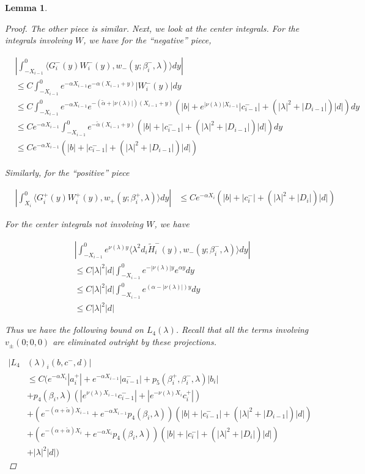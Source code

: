 \documentclass[12pt]{article}
\newtheorem{lemma}{Lemma}
\begin{document}
\begin{lemma}
\begin{proof}
The other piece is similar. Next, we look at the center integrals. For the integrals involving $W$, we have for the ``negative'' piece,

\begin{align*}
&\left| \int_{-X_{i-1}}^0 \langle G_i^-(y) W_i^-(y), w_-(y; \beta_i^-, \lambda) \rangle dy \right| \\
&\leq C \int_{-X_{i-1}}^0 e^{-\alpha X_{i-1}} e^{-\alpha(X_{i-1} + y)} |W_i^-(y)| dy \\
&\leq C \int_{-X_{i-1}}^0 e^{-\alpha X_{i-1}} e^{-(\tilde{\alpha} + |\nu(\lambda)|)(X_{i-1} + y)} ( |b| + e^{|\nu(\lambda)|X_{i-1}}|c_{i-1}^-| + (|\lambda|^2 + |D_{i-1}|)|d| ) dy \\
&\leq C e^{-\alpha X_{i-1}} \int_{-X_{i-1}}^0  e^{-\tilde{\alpha}(X_{i-1} + y)} ( |b| + |c_{i-1}^-| + (|\lambda|^2 + |D_{i-1}|)|d| ) dy \\
&\leq C e^{-\alpha X_{i-1}} ( |b| + |c_{i-1}^-| + (|\lambda|^2 + |D_{i-1}|)|d| )
\end{align*}

Similarly, for the ``positive'' piece

\begin{align*}
&\left| \int_{X_i}^0 \langle G_i^+(y) W_i^+(y), w_+(y; \beta_i^+, \lambda) \rangle dy \right| 
&\leq C e^{-\alpha X_i}  ( |b| + |c_i^-| + (|\lambda|^2 + |D_i|)|d| )
\end{align*}

For the center integrals not involving $W$, we have

\begin{align*}
&\left| \int_{-X_{i-1}}^0
e^{\nu(\lambda)y} \langle \lambda^2 d_i \tilde{H}_i^-(y), w_-(y; \beta_i^-, \lambda) \rangle dy \right| \\
&\leq C |\lambda|^2 |d| \int_{-X_{i-1}}^0 e^{-|\nu(\lambda)|y}e^{\alpha y} dy \\
&\leq C |\lambda|^2 |d| \int_{-X_{i-1}}^0 e^{(\alpha -|\nu(\lambda)|) y} dy \\
&\leq C |\lambda|^2 |d| 
\end{align*}

Thus we have the following bound on $L_4(\lambda)$. Recall that all the terms involving $v_\pm(0; 0, 0)$ are eliminated outright by these projections.

\begin{align*}
|L_4&(\lambda)_i(b, c^-, d)|\\ 
&\leq C \Big( e^{-\alpha X_i} |a_i^+| +  e^{-\alpha X_{i-1}} |a_{i-1}^-| + p_5(\beta_i^+, \beta_i^-, \lambda) |b_i| \\
&+ p_4(\beta_i, \lambda)( |e^{\nu(\lambda)X_{i-1}} c_{i-1}^-| + |e^{-\nu(\lambda)X_i} c_i^+|) \\
&+ (e^{-(\alpha + \tilde{\alpha}) X_{i-1}} + e^{-\alpha X_{i-1}} p_4(\beta_i, \lambda))( |b| + |c_{i-1}^-| + (|\lambda|^2 + |D_{i-1}|)|d| ) \\
&+ (e^{-(\alpha + \tilde{\alpha}) X_i} + e^{-\alpha X_i} p_4(\beta_i, \lambda))( |b| + |c_i^-| + (|\lambda|^2 + |D_i|)|d| ) \\
&+ |\lambda|^2 |d|  \Big)
\end{align*}


\end{proof}
\end{lemma}
\end{document}
